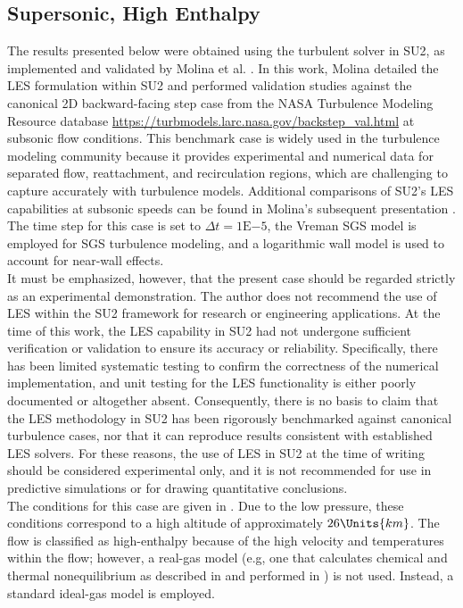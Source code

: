 \subsection{Supersonic, High Enthalpy\label{sec:supersonicLES}}
The results presented below were obtained using the turbulent solver in
\gls{SU2}, as implemented and validated by Molina et al. \cite{Molina2017}.
In this work, Molina detailed the \gls{LES} formulation within \gls{SU2} and
performed validation studies against the canonical 2D backward-facing step
case from the \gls{NASA} Turbulence Modeling Resource database
\href{https://turbmodels.larc.nasa.gov/backstep_val.html}{https://turbmodels.larc.nasa.gov/backstep\_val.html}
at subsonic flow conditions. This benchmark case is widely used in the
turbulence modeling community because it provides experimental and numerical
data for separated flow, reattachment, and recirculation regions, which are
challenging to capture accurately with turbulence models. Additional
comparisons of \gls{SU2}'s \gls{LES} capabilities at subsonic speeds can be
found in Molina's subsequent presentation \cite{Molina2020}. The time step for this case is set to $\Delta t = 1\mathrm{E}{-5}$, the Vreman
\acrfull{SGS} model \cite{Vreman2004} is employed for \gls{SGS} turbulence
modeling, and a logarithmic wall model is used to account for near-wall
effects.\\

It must be emphasized, however, that the present case should be regarded
strictly as an experimental demonstration. The author does not recommend the
use of \gls{LES} within the \gls{SU2} framework for research or engineering
applications. At the time of this work, the \gls{LES} capability in \gls{SU2}
had not undergone sufficient verification or validation to ensure its accuracy
or reliability. Specifically, there has been limited systematic testing to
confirm the correctness of the numerical implementation, and unit testing for
the \gls{LES} functionality is either poorly documented or altogether absent.
Consequently, there is no basis to claim that the \gls{LES} methodology in
\gls{SU2} has been rigorously benchmarked against canonical turbulence cases,
nor that it can reproduce results consistent with established \gls{LES}
solvers. For these reasons, the use of \gls{LES} in \gls{SU2} at the time of
writing should be considered experimental only, and it is not recommended for
use in predictive simulations or for drawing quantitative conclusions. \\

The conditions for this case are given in . Due to the low
pressure, these conditions correspond to a high altitude of approximately
$26\Units{km}$. The flow is classified as high-enthalpy because of the high
velocity and temperatures within the flow; however, a real-gas model (e.g, one
that calculates chemical and thermal nonequilibrium as described in
 and performed in ) is not
used. Instead, a standard ideal-gas model is employed. \\

